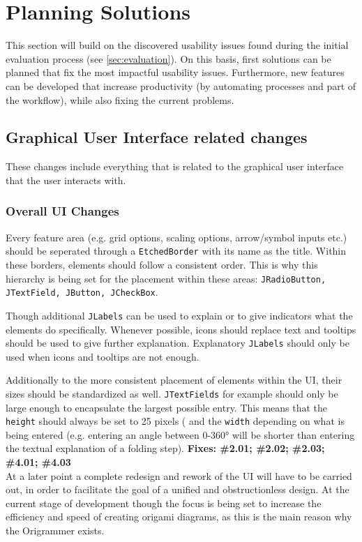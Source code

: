 
\section{Planning Solutions}
\label{sec:planningSolutions}

This section will build on the discovered usability issues found during the initial evaluation process (see \ref{sec:evaluation}). On this basis, first solutions can be planned that fix the most impactful usability issues. Furthermore, new features can be developed that increase productivity (by automating processes and part of the workflow), while also fixing the current problems.


\subsection{Graphical User Interface related changes}

These changes include everything that is related to the graphical user interface that the user interacts with.

\subsubsection{Overall UI Changes}
Every feature area (e.g. grid options, scaling options, arrow/symbol inputs etc.) should be seperated through a \texttt{EtchedBorder} with its name as the title. Within these borders, elements should follow a consistent order. This is why this hierarchy is being set for the placement within these areas: \texttt{JRadioButton, JTextField, JButton, JCheckBox}.

Though additional \texttt{JLabels} can be used to explain or to give indicators what the elements do specifically. Whenever possible, icons should replace text and tooltips should be used to give further explanation. Explanatory \texttt{JLabels} should only be used when icons and tooltips are not enough.

Additionally to the more consistent placement of elements within the UI, their sizes should be standardized as well. \texttt{JTextFields} for example should only be large enough to encapsulate the largest possible entry. This means that the \texttt{height} should always be set to 25 pixels ( and the \texttt{width} depending on what is being entered (e.g. entering an angle between 0-360° will be shorter than entering the textual explanation of a folding step).
\newline
\textbf{Fixes: \#2.01; \#2.02; \#2.03; \#4.01; \#4.03}\\
\newline
At a later point a complete redesign and rework of the UI will have to be carried out, in order to facilitate the goal of a unified and obstructionless design. At the current stage of development though the focus is being set to increase the efficiency and speed of creating origami diagrams, as this is the main reason why the Origrammer exists.

